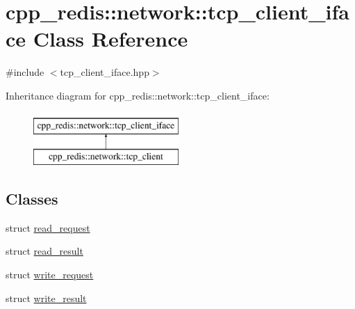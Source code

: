 \hypertarget{classcpp__redis_1_1network_1_1tcp__client__iface}{}\section{cpp\+\_\+redis\+:\+:network\+:\+:tcp\+\_\+client\+\_\+iface Class Reference}
\label{classcpp__redis_1_1network_1_1tcp__client__iface}


{\ttfamily \#include $<$tcp\+\_\+client\+\_\+iface.\+hpp$>$}

Inheritance diagram for cpp\+\_\+redis\+:\+:network\+:\+:tcp\+\_\+client\+\_\+iface\+:\begin{figure}[H]
\begin{center}
\leavevmode
\includegraphics[height=2.000000cm]{classcpp__redis_1_1network_1_1tcp__client__iface}
\end{center}
\end{figure}
\subsection*{Classes}
\begin{DoxyCompactItemize}
\item 
struct \mbox{\hyperlink{structcpp__redis_1_1network_1_1tcp__client__iface_1_1read__request}{read\+\_\+request}}
\item 
struct \mbox{\hyperlink{structcpp__redis_1_1network_1_1tcp__client__iface_1_1read__result}{read\+\_\+result}}
\item 
struct \mbox{\hyperlink{structcpp__redis_1_1network_1_1tcp__client__iface_1_1write__request}{write\+\_\+request}}
\item 
struct \mbox{\hyperlink{structcpp__redis_1_1network_1_1tcp__client__iface_1_1write__result}{write\+\_\+result}}
\end{DoxyCompactItemize}
